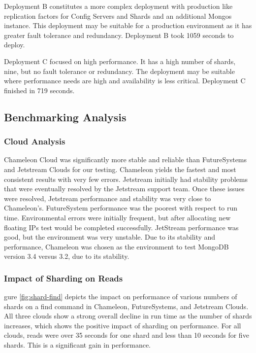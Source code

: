 \documentclass[sigconf]{acmart}
\begin{document}
Deployment B constitutes a more complex deployment with production like
replication factors for Config Servers and Shards and an additional
Mongos instance.  This deployment may be suitable for a production
environment as it has greater fault tolerance and redundancy.
Deployment B took 1059 seconds to deploy.

Deployment C focused on high performance.  It has a high number of
shards, nine, but no fault tolerance or redundancy.  The deployment
may be suitable where performance needs are high and availability is
less critical.  Deployment C finished in 719 seconds.



\subsection{Benchmarking Analysis}


\subsubsection{Cloud Analysis}

Chameleon Cloud was significantly more stable and reliable than FutureSystems and Jetstream Clouds for our testing.  Chameleon yields the fastest and most consistent results with very few errors.  Jetstream initially had stability problems that were eventually resolved by the Jetstream support team.  Once these issues were resolved, Jetstream performance and stability was very close to Chameleon's.  FutureSystem performance was the poorest with respect to run time.  Environmental errors were initially frequent, but after allocating new floating IPs test would be completed successfully.  JetStream performance was good, but the environment was very unstable.  Due to its stability and performance, Chameleon was chosen as the environment to test MongoDB version 3.4 versus 3.2, due to its stability.

\subsubsection{Impact of Sharding on Reads}


gure \ref{fig:shard-find} depicts the impact on performance of various numbers of shards on a find command in Chameleon, FutureSystems, and Jetstream Clouds.  All three clouds show a strong overall decline in run time as the number of shards increases, which shows the positive impact of sharding on performance.  For all clouds, reads were over 35 seconds for one shard and less than 10 seconds for five shards.  This is a significant gain in performance. 
\end{document}

